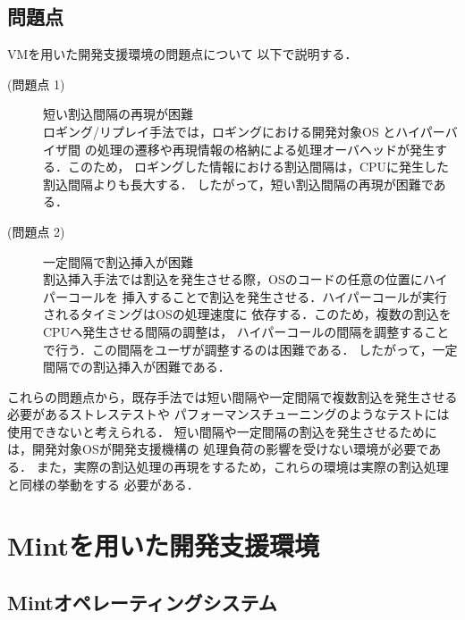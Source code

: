 \documentclass[submit,techreq,noauthor,dvipdfmx]{ipsj}
\begin{document}
\subsection{問題点}\label{sec:problem}

VMを用いた開発支援環境の問題点について
以下で説明する．

\begin{description}
    \item[(問題点 1)]短い割込間隔の再現が困難\\
        ロギング/リプレイ手法では，ロギングにおける開発対象OS とハイパーバイザ間
        の処理の遷移や再現情報の格納による処理オーバヘッドが発生する．このため，
        ロギングした情報における割込間隔は，CPUに発生した割込間隔よりも長大する．
        したがって，短い割込間隔の再現が困難である．

    \item[(問題点 2)]一定間隔で割込挿入が困難\\
        割込挿入手法では割込を発生させる際，OSのコードの任意の位置にハイパーコールを
        挿入することで割込を発生させる．ハイパーコールが実行されるタイミングはOSの処理速度に
        依存する．このため，複数の割込をCPUへ発生させる間隔の調整は，
        ハイパーコールの間隔を調整することで行う．この間隔をユーザが調整するのは困難である．
        したがって，一定間隔での割込挿入が困難である．

\end{description}

これらの問題点から，既存手法では短い間隔や一定間隔で複数割込を発生させる必要があるストレステストや
パフォーマンスチューニングのようなテストには使用できないと考えられる．
短い間隔や一定間隔の割込を発生させるためには，開発対象OSが開発支援機構の
処理負荷の影響を受けない環境が必要である．
また，実際の割込処理の再現をするため，これらの環境は実際の割込処理と同様の挙動をする
必要がある．

\section{Mintを用いた開発支援環境}\label{chap:Mint}

\subsection{Mintオペレーティングシステム}\label{sec:structure_of_Mint}
\end{document}

